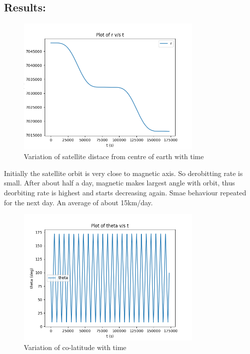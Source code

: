 \documentclass[11pt, a4paper]{article}
\begin{document}
\subsection{Results:}
\begin{figure}[H]
 \centering
 \includegraphics[width = 0.8\textwidth]{2dayr_.png}
 \caption{Variation of satellite distace from centre of earth with time}
\end{figure}

Initially the satellite orbit is very close to magnetic axis. So derobitting rate is small. After about half a day, magnetic 
makes largest angle with orbit, thus deorbiting rate is highest and starts decreasing again. Smae behaviour repeated for 
the next day. An average of about 15km/day.

\begin{figure}[H]
 \centering
 \includegraphics[width = 0.8\textwidth]{2daythet_.png}
 \caption{Variation of co-latitude with time}
\end{figure}
\end{document}
